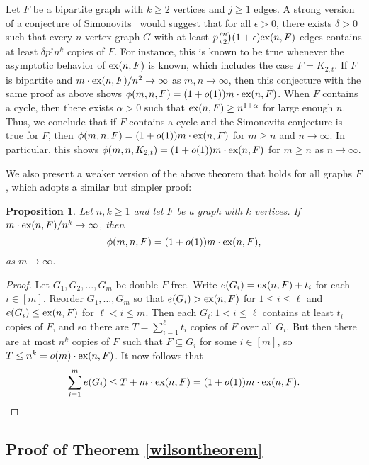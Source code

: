 \documentclass[12pt]{article}
\newtheorem{proposition}[theorem]{Proposition}
\newcommand*{\ex}{\textnormal{ex}}
\begin{document}
Let $F$ be a bipartite graph with $k \geq 2$ vertices and $j \geq 1$ edges. A strong version of a conjecture of Simonovits~\cite{Sidorenko1993,Simonovits1984} would suggest that for all $\epsilon > 0$, there exists $\delta > 0$ such that every $n$-vertex graph $G$ with at least $p\binom{n}{2}(1 + \epsilon)\ex(n,F)$ edges contains at least $\delta p^j n^{k}$ copies of $F$. For instance, this is known to be true whenever the asymptotic behavior of $\ex(n,F)$ is known, which includes the case $F = K_{2,t}$. If $F$ is bipartite and $m \cdot \ex(n,F)/n^2 \rightarrow \infty$ as $m,n \rightarrow \infty$, then this conjecture with the same proof as above shows $\phi(m, n, F) = (1 + o(1))m \cdot \ex(n,F)$. When $F$ contains a cycle, then there exists $\alpha > 0$ such that $\ex(n,F) \geq n^{1 + \alpha}$ for large enough $n$. Thus, we conclude that if $F$ contains a cycle and the Simonovits conjecture is true for $F$, then $\phi(m, n, F) = (1 + o(1))m \cdot \ex(n,F)$ for $m \geq n$ and $n \rightarrow \infty$. In particular, this shows $\phi(m,n,K_{2,t}) = (1 + o(1))m \cdot \ex(n,F)$ for $m \geq n$ as $n \rightarrow \infty$.

We also present a weaker version of the above theorem that holds for all graphs $F$, which adopts a similar but simpler proof:

\begin{proposition}\label{thm:asymp-weak}
  Let $n, k \geq 1$ and let $F$ be a graph with $k$ vertices. If $m \cdot \ex(n, F)/n^k \to \infty$, then
  \[
    \phi(m, n, F) = (1 + o(1))m \cdot \ex(n, F),
  \]
  as $m \to \infty$.
\end{proposition}

\begin{proof}
  Let $G_1, G_2, \ldots, G_m$ be double $F$-free. Write $e(G_i) = \ex(n, F) + t_i$ for each $i \in [m]$. Reorder $G_1, \ldots, G_m$ so that $e(G_i) > \ex(n, F)$ for $1 \leq i \leq \ell$ and $e(G_i) \leq \ex(n, F)$ for $\ell < i \leq m$. Then each $G_i : 1 < i \leq \ell$ contains at least $t_i$ copies of $F$, and so there are $T = \sum_{i = 1}^\ell t_i$ copies of $F$ over all $G_i$. But then there are at most $n^k$ copies of $F$ such that $F \subseteq G_i$ for some $i \in [m]$, so $T \leq n^k = o(m) \cdot \ex(n, F)$. It now follows that
  \[
    \sum_{i = 1}^m e(G_i) \leq T + m \cdot \ex(n, F) = (1 + o(1))m \cdot \ex(n, F).
  \]
\end{proof}

\subsection{Proof of Theorem \ref{wilsontheorem}} 
\end{document}
